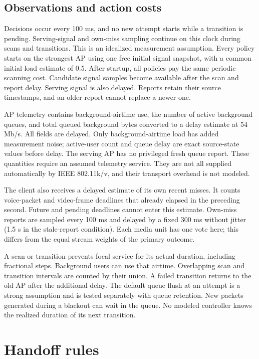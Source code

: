 \documentclass[11pt,a4paper]{article}
\begin{document}
\subsection{Observations and action costs}
Decisions occur every 100 ms, and no new attempt starts while a transition is pending. Serving-signal and own-miss sampling continue on this clock during scans and transitions. This is an idealized measurement assumption. Every policy starts on the strongest AP using one free initial signal snapshot, with a common initial load estimate of 0.5. After startup, all policies pay the same periodic scanning cost. Candidate signal samples become available after the scan and report delay. Serving signal is also delayed. Reports retain their source timestamps, and an older report cannot replace a newer one.

AP telemetry contains background-airtime use, the number of active background queues, and total queued background bytes converted to a delay estimate at 54 Mb/s. All fields are delayed. Only background-airtime load has added measurement noise; active-user count and queue delay are exact source-state values before delay. The serving AP has no privileged fresh queue report. These quantities require an assumed telemetry service. They are not all supplied automatically by IEEE 802.11k/v, and their transport overhead is not modeled.

The client also receives a delayed estimate of its own recent misses. It counts voice-packet and video-frame deadlines that already elapsed in the preceding second. Future and pending deadlines cannot enter this estimate. Own-miss reports are sampled every 100 ms and delayed by a fixed 300 ms without jitter (1.5 s in the stale-report condition). Each media unit has one vote here; this differs from the equal stream weights of the primary outcome.

A scan or transition prevents focal service for its actual duration, including fractional steps. Background users can use that airtime. Overlapping scan and transition intervals are counted by their union. A failed transition returns to the old AP after the additional delay. The default queue flush at an attempt is a strong assumption and is tested separately with queue retention. New packets generated during a blackout can wait in the queue. No modeled controller knows the realized duration of its next transition.

\section{Handoff rules}
\end{document}
